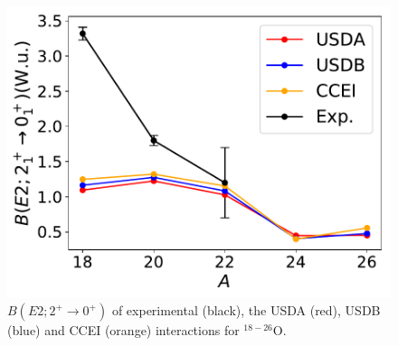 \documentclass[aps,prl,reprint,groupedaddress]{revtex4-1}  %
\begin{document}
\begin{figure}[h]
\includegraphics[width=1\linewidth]{../figures/oxygen-be2.pdf}
\caption{$B(E2; 2^+ \rightarrow 0^+)$ of experimental (black), the USDA (red), USDB (blue) and CCEI (orange) interactions for $^{18-26}$O. \label{oxygen-be2}}
\end{figure}

\pagebreak

\end{document}
